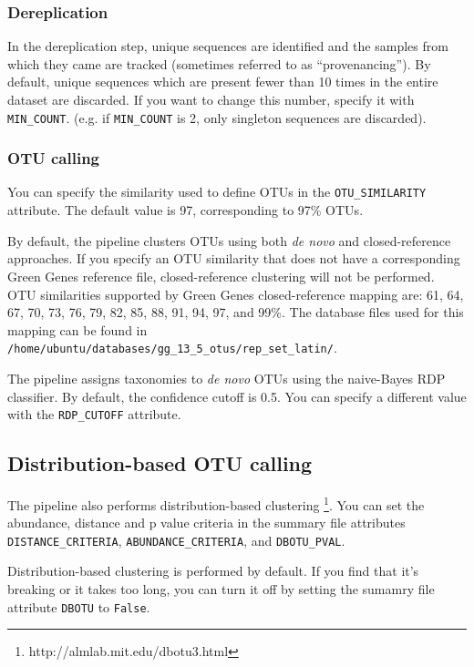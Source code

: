 \documentclass[11pt, oneside]{article}   	%
\begin{document}
\subsubsection{Dereplication}

In the dereplication step, unique sequences are identified and the
samples from which they came are tracked (sometimes referred to as 
``provenancing''). By default, unique sequences which are present fewer
than 10 times in the entire dataset are discarded. If you want to change
this number, specify it with \texttt{MIN\_COUNT}.  (e.g. if \texttt{MIN\_COUNT}
is 2, only singleton sequences are discarded).

\subsubsection{OTU calling}

You can specify the similarity used to define OTUs in the \texttt{OTU\_SIMILARITY}
attribute. The default value is 97, corresponding to 97\% OTUs.

By default, the pipeline clusters OTUs using both \textit{de novo} and closed-reference
approaches. If you specify an OTU similarity that does not have a corresponding
Green Genes reference file, closed-reference clustering will not be performed. 
OTU similarities supported by Green Genes closed-reference mapping are: 61, 64, 67, 70, 73, 76, 79, 82, 85, 88, 91, 94, 97, and 99\%. 
The database files used for this mapping can be found in \texttt{/home/ubuntu/databases/gg\_13\_5\_otus/rep\_set\_latin/}.

The pipeline assigns taxonomies to \textit{de novo} OTUs using the naive-Bayes RDP
classifier. By default, the confidence cutoff is 0.5. You can specify a different
value with the \texttt{RDP\_CUTOFF} attribute.

\subsection{Distribution-based OTU calling}

The pipeline also performs distribution-based clustering \footnote{http://almlab.mit.edu/dbotu3.html}. 
You can set the abundance, distance and p value criteria
in the summary file attributes \texttt{DISTANCE\_CRITERIA}, \texttt{ABUNDANCE\_CRITERIA}, and \texttt{DBOTU\_PVAL}.

Distribution-based clustering is performed by default. If you find
that it's breaking or it takes too long, you can turn it off by setting
the sumamry file attribute \texttt{DBOTU} to \texttt{False}.
\end{document}
